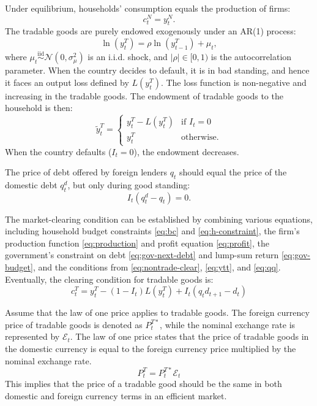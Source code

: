 Under equilibrium, households' consumption equals the production of firms:
\begin{equation}
    \label{eq:nontrade-clear}
    c^N_{t} = y^N_t.
\end{equation}
The tradable goods are purely endowed exogenously under an AR(1) process:
\begin{equation}
    \label{eq:ar1-output}
    \ln(y_t^T) = \rho \ln(y^T_{t-1}) + \mu_t,
\end{equation}
where $\mu_t \overset{\mathrm{iid}}{\sim} \mathcal{N}(0,\sigma_\mu^2)$ is an i.i.d. shock, and $ |\rho| \in [0,1)$ is the autocorrelation parameter.
When the country decides to default, it is in bad standing, and hence it faces an output loss defined by $L(y^T_t)$. The loss function is non-negative and increasing in the tradable goods. The endowment of tradable goods to the household is then:
\begin{equation}
    \label{eq:ytt}
    \tilde{y}^T_t =
        \begin{cases}
        y^T_t  - L(y^T_t) & \text{if } I_t = 0 \\
        y^T_t & \text{otherwise.}
        \end{cases}
\end{equation}
When the country defaults ($I_t = 0$), the endowment decreases.

The price of debt offered by foreign lenders $q_t$ should equal the price of the domestic debt $q^d_t$, but only during good standing:
\begin{equation}
    \label{eq:qq}
    I_t(q^d_t - q_t) = 0.
\end{equation}

The market-clearing condition can be established by combining various equations, including household budget constraints \eqref{eq:bc} and \eqref{eq:h-constraint}, the firm's production function \eqref{eq:production} and profit equation \eqref{eq:profit}, the government's constraint on debt \eqref{eq:gov-next-debt} and lump-sum return \eqref{eq:gov-budget}, and the conditions from \eqref{eq:nontrade-clear}, \eqref{eq:ytt}, and \eqref{eq:qq}.
Eventually, the clearing condition for tradable goods is:
\begin{equation}
    \label{eq:market-clearing}
    c^T_t = y^T_t - (1 - I_t)L(y^T_t) + I_t(q_t d_{t+1} - d_t)
\end{equation}

Assume that the law of one price applies to tradable goods. The foreign currency price of tradable goods is denoted as $P^{T*}_t$, while the nominal exchange rate is represented by $\mathcal{E}_t$. The law of one price states that the price of tradable goods in the domestic currency is equal to the foreign currency price multiplied by the nominal exchange rate.
\begin{equation*}
    P^T_t = P^{T*}_t \mathcal{E}_t
\end{equation*}
This implies that the price of a tradable good should be the same in both domestic and foreign currency terms in an efficient market.

